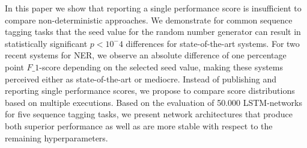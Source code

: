 In this paper we show that reporting a single performance score is insufficient to compare non-deterministic approaches. We demonstrate for common sequence tagging tasks that the seed value for the random number generator can result in statistically significant $p < 10^-4$ differences for state-of-the-art systems. For two recent systems for NER, we observe an absolute difference of one percentage point $F\_1$-score depending on the selected seed value, making these systems perceived either as state-of-the-art or mediocre. Instead of publishing and reporting single performance scores, we propose to compare score distributions based on multiple executions. Based on the evaluation of 50.000 LSTM-networks for five sequence tagging tasks, we present network architectures that produce both superior performance as well as are more stable with respect to the remaining hyperparameters.
